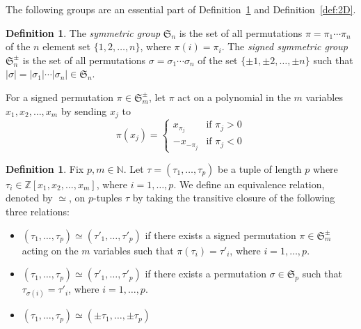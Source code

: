 \documentclass[12pt]{article}
\theoremstyle{definition}
\newtheorem{definition}[theorem]{Definition}
\theoremstyle{remark}
\newcommand{\Nnn}{\mathbb N}
\newcommand{\Zzz}{\mathbb Z}
\numberwithin{equation}{section}
\begin{document}

The following groups are an essential part of Definition~\ref{def:general}
and Definition~\ref{def:2D}.
\begin{definition}
The {\em symmetric group} \( \mathfrak{S}_n \) is the 
set of all permutations \( \pi = \pi_1 \cdots \pi_n \) 
of the \( n \) element set \( \{ 1, 2, \ldots, n \} \),
where \( \pi(i) = \pi_i \).
The {\em signed symmetric group} \( \mathfrak{S}_n^\pm \)
is the set of all permutations \( \sigma = \sigma_1 \cdots \sigma_n\)
of the set \( \{ \pm 1, \pm 2, \ldots, \pm n \} \) such that
\( | \sigma | = | \sigma_1 | \cdots |\sigma_n| \in \mathfrak{S}_n \).
\end{definition}


For a signed permutation \( \pi \in \mathfrak{S}_m^\pm \),
let \( \pi \) act on a polynomial in the 
\(m\) variables \( x_1,x_2, \ldots, x_m \) by sending \( x_j \) to 
\[
\pi(x_j) =
\begin{cases}
x_{\pi_j} & \text{if } \pi_j > 0 \\
-x_{-\pi_j} & \text{if } \pi_j < 0
\end{cases}
\]

\begin{definition}
\label{def:general}
Fix \( p, m \in \Nnn \). 
Let \( \tau = ( \tau_1, \ldots, \tau_p) \)
be a tuple of length \( p \) where 
\( \tau_i \in \Zzz[x_1,x_2, \ldots, x_m] \), where \( i = 1, \ldots, p \).
We define an equivalence relation, denoted by \( \simeq \), on \(p\)-tuples
\( \tau \) 
by taking the transitive closure of the following three relations:
\begin{itemize}
\item
\( ( \tau_1, \ldots, \tau_p) \simeq ( \tau'_1, \ldots, \tau'_p) \)
if there exists a signed permutation \( \pi \in \mathfrak{S}_m^\pm \)
acting on the \( m \) variables such that \( \pi( \tau_i ) = \tau'_i \),
 where \( i = 1, \ldots, p \).
\item
\( ( \tau_1, \ldots, \tau_p) \simeq ( \tau'_1, \ldots, \tau'_p) \)
if there exists a permutation \( \sigma \in \mathfrak{S}_p \)
such that \( \tau_{\sigma(i)} = \tau'_i \), where \( i = 1, \ldots, p \).
\item
\( ( \tau_1, \ldots, \tau_p) \simeq ( \pm \tau_1, \ldots, \pm \tau_p) \)
\end{itemize}
\end{definition}
\end{document}
